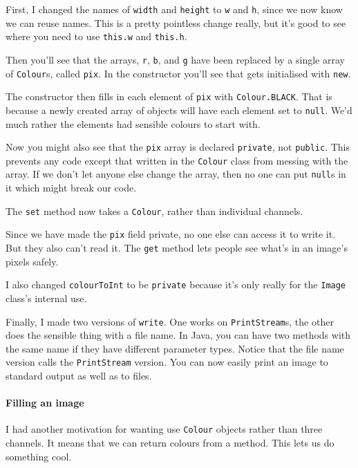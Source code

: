 \documentclass{article}
\begin{document}
            First, I changed the names of \texttt{width} and \texttt{height} to \texttt{w} and \texttt{h}, since we now know we can reuse
            names. This is a pretty pointless change really, but it's good to see where you need to use \texttt{this.w} and \texttt{this.h}.
            
            Then you'll see that the arrays, \texttt{r}, \texttt{b}, and \texttt{g} have been replaced by a single array of
            \texttt{Colour}s, called \texttt{pix}. In the constructor you'll see that gets initialised with \texttt{new}.

            The constructor then fills in each element of \texttt{pix} with \texttt{Colour.BLACK}. That is because a newly created array of
            objects will have each element set to \texttt{null}. We'd much rather the elements had sensible colours to start with.
            
            Now you might also see that the \texttt{pix} array is declared \texttt{private}, not \texttt{public}. This prevents any code
            except that written in the \texttt{Colour} class from messing with the array. If we don't let anyone else change the array,
            then no one can put \texttt{null}s in it which might break our code.
            
            The \texttt{set} method now takes a \texttt{Colour}, rather than individual channels.
            
            Since we have made the \texttt{pix} field private, no one else can access it to write it. But they also can't read it. The
            \texttt{get} method lets people see what's in an image's pixels safely. 
            
            I also changed \texttt{colourToInt} to be \texttt{private} because it's only really for the \texttt{Image} class's internal use.
            
            Finally, I made two versions of \texttt{write}. One works on \texttt{PrintStream}s, the other does the sensible thing with a
            file name. In Java, you can have two methods with the same name if they have different parameter types. Notice that the file
            name version calls the \texttt{PrintStream} version. You can now easily print an image to standard output as well as to files.
            
        \paragraph{Filling an image}
            I had another motivation for wanting use \texttt{Colour} objects rather than three channels. It means that we can return
            colours from a method. This lets us do something cool.
            
\end{document}
